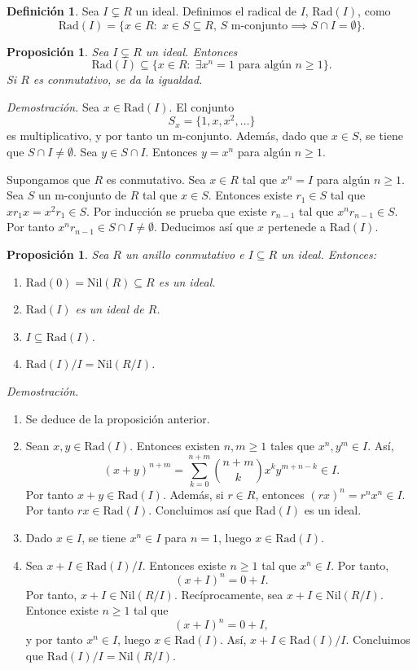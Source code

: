 \documentclass[11pt]{book}
\def\Nil{\mathrm{Nil}}
\def\Rad{\mathrm{Rad}}
\newtheorem{prop}[theorem]{Proposición}
\theoremstyle{definition}
\newtheorem{definition}{Definición}[section]
\begin{document}
\begin{definition}
    Sea $I\subsetneq R$ un ideal. Definimos el radical de $I$, $\Rad(I)$, como\[
    \Rad(I)=\{x\in R:\; x\in S\subseteq R,\, S\text{ m-conjunto}\implies S\cap I=\emptyset\}.
    \]
\end{definition}
\begin{prop}
    Sea $I\subsetneq R$ un ideal. Entonces\[
    \Rad(I)\subseteq\{x\in R:\;\exists x^n=1\text{ para algún }n\geq 1\}.
    \]Si $R$ es conmutativo, se da la igualdad.
\end{prop}
\noindent\textit{Demostración.} Sea $x\in \Rad(I)$. El conjunto \[
S_x=\{1,x,x^2,\dots\}
\]es multiplicativo, y por tanto un m-conjunto. Además, dado que $x\in S$, se tiene que $S\cap I\neq \emptyset$. Sea $y\in S\cap I$. Entonces $y=x^n$ para algún $n\geq 1$. 

Supongamos que $R$ es conmutativo. Sea $x\in R$ tal que $x^n=I$ para algún $n\geq 1$. Sea $S$ un m-conjunto de $R$ tal que $x\in S$. Entonces existe $r_1\in S$ tal que $xr_1x=x^2r_1\in S$. Por inducción se prueba que existe $r_{n-1}$ tal que $x^nr_{n-1}\in S$. Por tanto $x^nr_{n-1}\in S\cap I\neq \emptyset$. Deducimos así que $x$ pertenede a $\Rad(I)$.

\begin{prop}
    Sea $R$ un anillo conmutativo e $I\subseteq R$ un ideal. Entonces:\begin{enumerate}
        \item $\Rad(0)=\Nil(R)\subseteq R$ es un ideal.
        \item $\Rad(I)$ es un ideal de $R$.
        \item $I\subseteq \Rad(I)$.
        \item $\Rad(I)/I=\Nil(R/I)$.
    \end{enumerate}
\end{prop}
\noindent\textit{Demostración.}\begin{enumerate}
    \item Se deduce de la proposición anterior.
    \item Sean $x,y\in \Rad(I)$. Entonces existen $n,m\geq 1$ tales que $x^n,y^m\in I$. Así,\[
    (x+y)^{n+m}=\sum_{k=0}^{n+m}\binom{n+m}{k}x^ky^{m+n-k}\in I.
    \]Por tanto $x+y\in \Rad(I)$. Además, si $r\in R$, entonces $(rx)^n=r^nx^n\in I$. Por tanto $rx\in \Rad(I)$. Concluimos así que $\Rad(I)$ es un ideal.
    \item Dado $x\in I$, se tiene $x^n\in I$ para $n=1$, luego $x\in\Rad(I)$.
    \item Sea $x+I\in \Rad(I)/I$. Entonces existe $n\geq 1$ tal que $x^n\in I$. Por tanto,\[
    (x+I)^n=0 + I.
    \]Por tanto, $x+I\in\Nil(R/I)$. Recíprocamente, sea $x+I\in\Nil(R/I)$. Entonce existe $n\geq 1$ tal que \[
    (x+I)^n=0+I,
    \]y por tanto $x^n\in I$, luego $x\in\Rad(I)$. Así, $x+I\in \Rad(I)/I$. Concluimos que $\Rad(I)/I=\Nil(R/I)$.
\end{enumerate}
\end{document}
